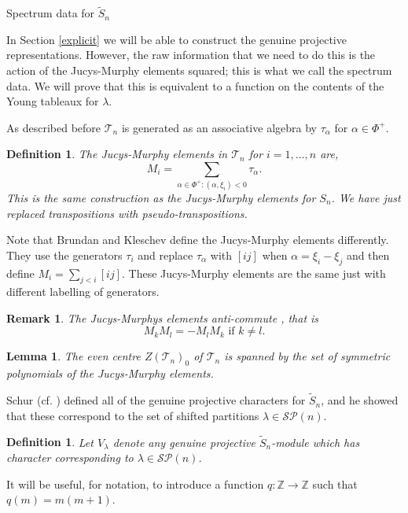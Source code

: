 \documentclass[a4paper,10pt]{amsart}
\newtheorem{definition}[theorem]{Definition}
\newtheorem{lemma}[theorem]{Lemma}
\newtheorem{remark}[theorem]{Remark}
\begin{document}
\begin{section}{Spectrum data for $\tilde{S}_n$}\label{spectrum} 


 In Section \ref{explicit} we will be able to construct the genuine projective representations. However, the raw information that we need to do this is the action of the Jucys-Murphy elements squared; this is what we call the spectrum data. We will prove that this is equivalent to a function on the contents of the Young tableaux for $\lambda$.

As described before $\mathcal{T}_n$ is generated as an associative algebra by $\tau_\alpha$ for $\alpha \in \Phi^+$. 


 \begin{definition}\cite[3.1]{BK01} The Jucys-Murphy elements in $\mathcal{T}_n$ for $i=1,\ldots ,n$ are, $$M_i = \sum_{\alpha \in \Phi^+ : ( \alpha , \xi_i ) < 0} \tau_\alpha.$$ This is the same construction as the Jucys-Murphy elements for $S_n$. We have just replaced transpositions with pseudo-transpositions.  \end{definition} 
Note that Brundan and Kleschev define the Jucys-Murphy elements differently. They use the generators $\tau_i$ and replace $\tau_\alpha$ with $[ij]$ when $\alpha = \xi_i-\xi_j$ and then define $M_i =  \sum_{j <i} [ij]$. These Jucys-Murphy elements are the same just with different labelling of generators.  
 
\begin{remark}\label{anti-commute} The Jucys-Murphys elements anti-commute \cite[3.1]{BK01}, that is 
 $$M_kM_l = -M_lM_k \text{ if } k \neq l.$$ \end{remark}
 
 \begin{lemma} \cite[3.2]{BK01} The even centre $Z(\mathcal{T}_n)_0$ of $\mathcal{T}_n$ is spanned by the set of symmetric polynomials of the Jucys-Murphy elements. \end{lemma}
 
 
 Schur (cf. \cite{S89}) defined all of the genuine projective characters for $\tilde{S}_n$, and he showed that these correspond to the set of shifted partitions $\lambda \in \mathcal{SP}(n)$.
 
\begin{definition}  Let $V_\lambda$ denote any genuine projective $\tilde{S}_n$-module which has character corresponding to $\lambda \in \mathcal{SP}(n)$. \end{definition}

It will be useful, for notation, to introduce a function $q:\mathbb{Z} \to \mathbb{Z}$ such that $q(m) = m(m+1)$.


\end{section}
\end{document}
